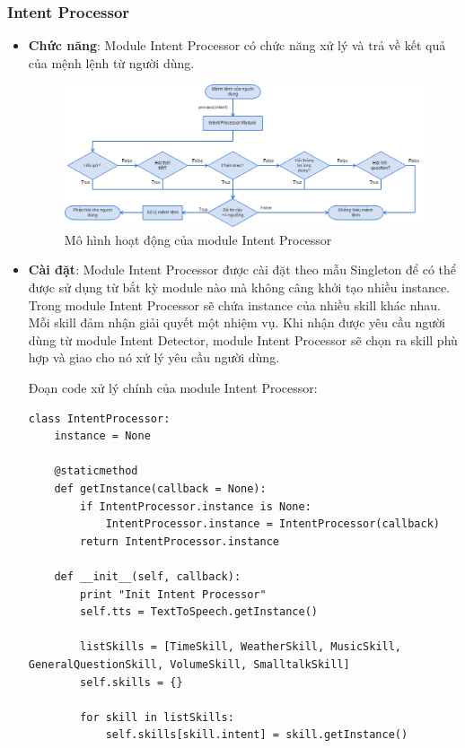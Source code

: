 \subsubsection{Intent Processor}
\begin{itemize}
\item \textbf{Chức năng}: Module Intent Processor có chức năng xử lý và trả về kết quả của mệnh lệnh từ người dùng.

\begin{figure}[H]
    \centering
    \includegraphics[scale=0.5]{intent_processor_flowchart}
    \caption{Mô hình hoạt động của module Intent Processor}
    \label{fig:c6_intent_processor_flowchart}
\end{figure}

\item \textbf{Cài đặt}: Module Intent Processor được cài đặt theo mẫu Singleton để có thể được sử dụng từ bắt kỳ module nào mà không câng khởi tạo nhiều instance. Trong module Intent Processor sẽ chứa instance của nhiều skill khác nhau. Mỗi skill đảm nhận giải quyết một nhiệm vụ. Khi nhận được yêu cầu người dùng từ module Intent Detector, module Intent Processor sẽ chọn ra skill phù hợp và giao cho nó xử lý yêu cầu người dùng.

Đoạn code xử lý chính của module Intent Processor:
\begin{lstlisting}
class IntentProcessor:
    instance = None

    @staticmethod
    def getInstance(callback = None):
        if IntentProcessor.instance is None:
            IntentProcessor.instance = IntentProcessor(callback)
        return IntentProcessor.instance

    def __init__(self, callback):
        print "Init Intent Processor"
        self.tts = TextToSpeech.getInstance()

        listSkills = [TimeSkill, WeatherSkill, MusicSkill, GeneralQuestionSkill, VolumeSkill, SmalltalkSkill]
        self.skills = {}

        for skill in listSkills:
            self.skills[skill.intent] = skill.getInstance()
        

\end{lstlisting}
\end{itemize}
